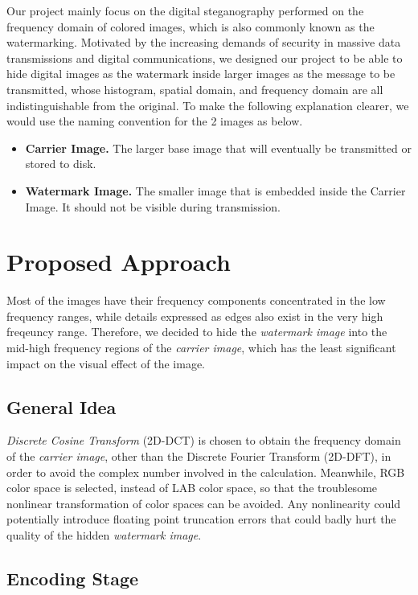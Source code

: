 \documentclass{article}
\begin{document}
Our project mainly focus on the digital steganography performed on the frequency
domain of colored images, which is also commonly known as the watermarking.
Motivated by the increasing demands of security in massive data transmissions
and digital communications, we designed our project to be able to hide digital
images as the watermark inside larger images as the message to
be transmitted, whose histogram, spatial domain, and frequency domain are all
indistinguishable from the original. To make the following explanation clearer,
we would use the naming convention for the 2 images as below.
\begin{itemize}
    \item \textbf{Carrier Image.} The larger base image that will
        eventually be transmitted or stored to disk.
    \item \textbf{Watermark Image.} The smaller image that is embedded inside
        the Carrier Image. It should not be visible during transmission.
\end{itemize}

\section{Proposed Approach}

Most of the images have their frequency components concentrated in the low
frequency ranges, while details expressed as edges also exist in the very high
freqeuncy range. Therefore, we decided to hide the \textit{watermark image}
into the mid-high frequency regions of the \textit{carrier image}, which has
the least significant impact on the visual effect of the image.

\subsection{General Idea}

\textit{Discrete Cosine Transform} (2D-DCT) is chosen to obtain the frequency domain of the
\textit{carrier image}, other than the Discrete Fourier Transform (2D-DFT),
in order to avoid
the complex number involved in the calculation. Meanwhile, RGB color space is
selected, instead of LAB color space, so that the troublesome nonlinear transformation of
color spaces can be avoided. Any nonlinearity could potentially introduce floating
point truncation errors that could badly hurt the quality of the hidden
\textit{watermark image}.

\subsection{Encoding Stage}
\end{document}
